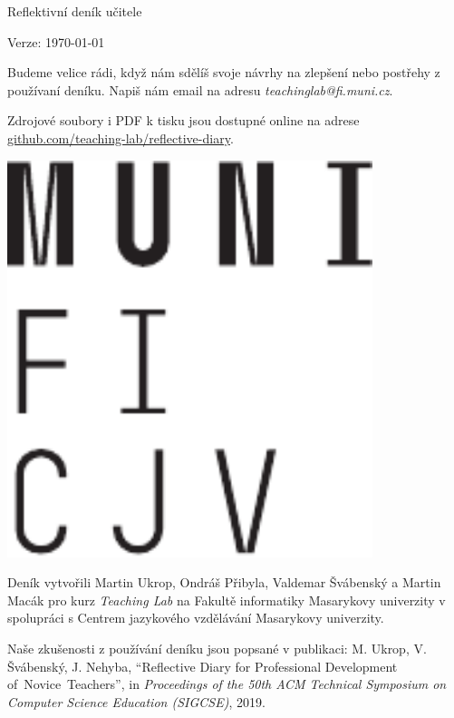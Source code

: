 \documentclass[twoside,openany]{book}
\begin{document}







\newpage
\vspace*{\fill}
Reflektivní deník učitele

Verze: \today

\bigskip
Budeme velice rádi, když nám sdělíš svoje návrhy na zlepšení nebo postřehy z používaní deníku. Napiš nám email na adresu \textit{teachinglab@fi.muni.cz}.

Zdrojové soubory i PDF k tisku jsou dostupné online na adrese \url{github.com/teaching-lab/reflective-diary}.

\medskip
\begin{minipage}{0.28\textwidth}
	\includegraphics[width=0.80\textwidth]{../img/muni}\hfill
	\end{minipage}
\begin{minipage}{0.72\textwidth}
Deník vytvořili Martin Ukrop, Ondráš Přibyla, Valdemar Švábenský a Martin Macák pro kurz \textit{Teaching Lab} na Fakultě informatiky Masarykovy univerzity v spolupráci s Centrem jazykového vzdělávání Masarykovy univerzity.
\end{minipage}

\medskip
Naše zkušenosti z používání deníku jsou popsané v publikaci: M. Ukrop, V. Švábenský, J. Nehyba, \enquote{Reflective Diary for Professional Development of~Novice~Teachers}, in \textit{Proceedings of the 50th ACM Technical Symposium on Computer Science Education (SIGCSE)}, 2019.
\end{document}
